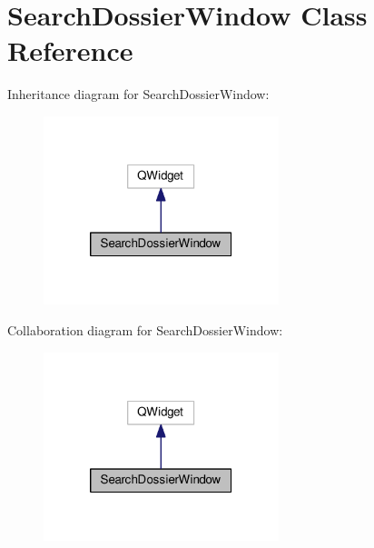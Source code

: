 \hypertarget{class_search_dossier_window}{\section{Search\-Dossier\-Window Class Reference}
\label{class_search_dossier_window}
}


Inheritance diagram for Search\-Dossier\-Window\-:
\nopagebreak
\begin{figure}[H]
\begin{center}
\leavevmode
\includegraphics[width=194pt]{class_search_dossier_window__inherit__graph}
\end{center}
\end{figure}


Collaboration diagram for Search\-Dossier\-Window\-:
\nopagebreak
\begin{figure}[H]
\begin{center}
\leavevmode
\includegraphics[width=194pt]{class_search_dossier_window__coll__graph}
\end{center}
\end{figure}
